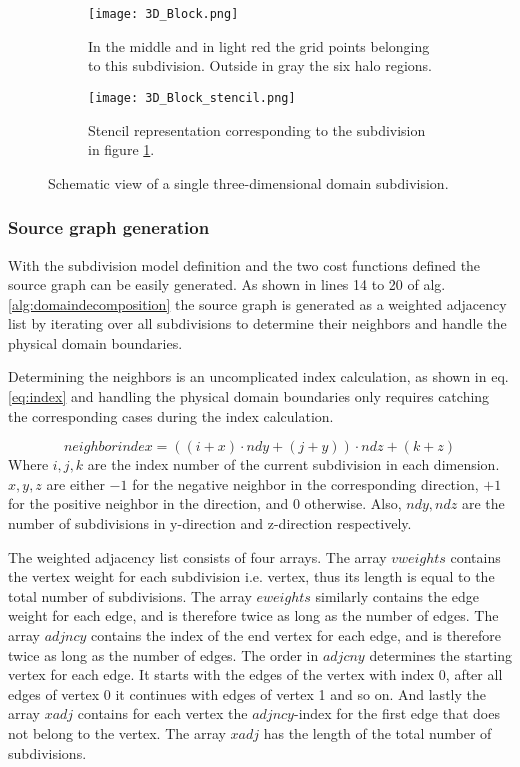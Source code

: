 \begin{figure}[!htbp]
\centering
\begin{subfigure}{0.8\textwidth}
  \centering
  \texttt{[image: 3D\_Block.png]}
  \caption{In the middle and in light red the grid points belonging to this subdivision.
Outside in gray the six halo regions.}
  \label{fig:3DBlock}
\end{subfigure}%
\begin{subfigure}{0.2\textwidth}
  \centering
  \texttt{[image: 3D\_Block\_stencil.png]}
  \caption{Stencil representation corresponding to the subdivision in figure \ref{fig:3DBlock}.}
  \label{fig:3DBlockStencil}
\end{subfigure}
\caption{Schematic view of a single three-dimensional domain subdivision.}
\label{fig:3D_subdivision}
\end{figure}

\subsubsection{Source graph generation}
With the subdivision model definition and the two cost functions defined the source graph can be easily generated.
As shown in lines 14 to 20 of alg. \ref{alg:domaindecomposition} the source graph is generated as a weighted adjacency list by iterating over all subdivisions to determine their neighbors and handle the physical domain boundaries.

Determining the neighbors is an uncomplicated index calculation, as shown in eq. \ref{eq:index} and handling the physical domain boundaries only requires catching the corresponding cases during the index calculation.

\begin{equation}
neighborindex = \left(\left(i + x\right) \cdot ndy + \left(j + y\right)\right) \cdot ndz + \left(k + z\right)
\label{eq:index}
\end{equation}
Where $i, j, k$ are the index number of the current subdivision in each dimension.
$x, y, z$ are either $-1$ for the negative neighbor in the corresponding direction, $+1$ for the positive neighbor in the direction, and $0$ otherwise. 
Also, $ndy, ndz$ are the number of subdivisions in y-direction and z-direction respectively.

The weighted adjacency list consists of four arrays.
The array $vweights$ contains the vertex weight for each subdivision i.e. vertex, thus its length is equal to the total number of subdivisions.
The array $eweights$ similarly contains the edge weight for each edge, and is therefore twice as long as the number of edges.
The array $adjncy$ contains the index of the end vertex for each edge, and is therefore twice as long as the number of edges.
The order in $adjcny$ determines the starting vertex for each edge.
It starts with the edges of the vertex with index 0, after all edges of vertex 0 it continues with edges of vertex 1 and so on.
And lastly the array $xadj$ contains for each vertex the $adjncy$-index for the first edge that does not belong to the vertex.
The array $xadj$ has the length of the total number of subdivisions.

